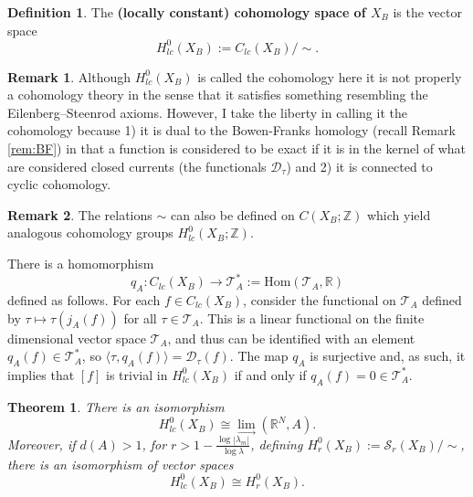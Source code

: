 \documentclass[12pt]{amsart}
\theoremstyle{plain}
\newtheorem{theorem}{Theorem}[section]
\theoremstyle{definition}
\newtheorem{definition}{Definition}[section]
\newtheorem{remark}{Remark}[section]
\begin{document}
\begin{definition}
The \textbf{(locally constant) cohomology space of $X_B$} is the vector space 
$$H^{0}_{lc}(X_B):= C_{lc}(X_B)/\sim.$$
\end{definition}
\begin{remark}
     Although $H^0_{lc}(X_B)$ is called the cohomology here it is not properly a cohomology theory in the sense that it satisfies something resembling the Eilenberg–Steenrod axioms. However, I take the liberty in calling it the cohomology because 1) it is dual to the Bowen-Franks homology (recall Remark \ref{rem:BF}) in that a function is considered to be exact if it is in the kernel of what are considered closed currents (the functionals $\mathcal{D}_\tau$) and 2) it is connected to cyclic cohomology.
\end{remark}
\begin{remark}
    The relations $\sim$ can also be defined on $C(X_B;\mathbb{Z})$ which yield analogous cohomology groups $H^{0}_{lc}(X_B;\mathbb{Z})$.
\end{remark}
    There is a homomorphism 
    $$q_A:C_{lc}(X_B)\rightarrow \mathcal{T}^{*}_A := \mathrm{Hom}(\mathcal{T} _A,\mathbb{R})$$
    defined as follows. For each $f\in C_{lc}(X_B)$, consider the functional on $\mathcal{T} _A$ defined by $\tau\mapsto \tau(j_A(f))$ for all $\tau\in \mathcal{T} _A$. This is a linear functional on the finite dimensional vector space $\mathcal{T} _A$, and thus can be identified with an element $q_A(f)\in \mathcal{T}^{*}_A$, so  $\langle \tau, q_A(f)\rangle = \mathcal{D}_\tau(f)$. The map $q_A$ is surjective and, as such, it implies that $[f]$ is trivial in $H^0_{lc}(X_B)$ if and only if $q_A(f) = 0 \in \mathcal{T}^{*}_A$.
\begin{theorem}
\label{thm:DirLim}
    There is an isomorphism 
    $$H_{lc}^0(X_B)\cong \lim_{\rightarrow} \left( \mathbb{R}^N,A\right).$$
    Moreover, if $d(A)>1$, for $r>1-\frac{\log|\lambda_m|}{\log\lambda}$, defining $H_r^0(X_B) := \mathcal{S}_r (X_B)/\sim$, there is an isomorphism of vector spaces
    $$H^0_{lc}(X_B)\cong H^0_r(X_B).$$
\end{theorem}
\end{document}
